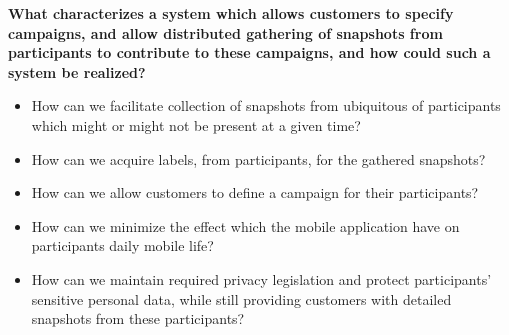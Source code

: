 

\textbf{What characterizes a system which allows customers to specify campaigns, and allow distributed gathering of snapshots from participants to contribute to these campaigns, and how could such a system be realized?}

\begin{itemize}
    \item How can we facilitate collection of snapshots from ubiquitous of participants which might or might not be present at a given time?

    \item How can we acquire labels, from participants, for the gathered snapshots?  
    
    \item How can we allow customers to define a campaign for their participants?
    
    \item How can we minimize the effect which the mobile application have on participants daily mobile life?

    \item How can we maintain required privacy legislation and protect participants' sensitive personal data, while still providing customers with detailed snapshots from these participants? 
\end{itemize}

